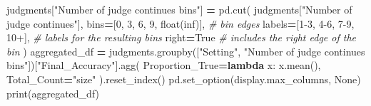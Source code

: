 \documentclass[
]{article}
\newenvironment{Shaded}{\begin{snugshade}}{\end{snugshade}}
\newcommand{\BuiltInTok}[1]{#1}
\newcommand{\CommentTok}[1]{\textcolor[rgb]{0.56,0.35,0.01}{\textit{#1}}}
\newcommand{\DecValTok}[1]{\textcolor[rgb]{0.00,0.00,0.81}{#1}}
\newcommand{\KeywordTok}[1]{\textcolor[rgb]{0.13,0.29,0.53}{\textbf{#1}}}
\newcommand{\NormalTok}[1]{#1}
\newcommand{\OperatorTok}[1]{\textcolor[rgb]{0.81,0.36,0.00}{\textbf{#1}}}
\newcommand{\StringTok}[1]{\textcolor[rgb]{0.31,0.60,0.02}{#1}}
\newcommand{\VariableTok}[1]{\textcolor[rgb]{0.00,0.00,0.00}{#1}}
\begin{document}
\begin{Shaded}
\begin{Highlighting}[]
\NormalTok{judgments[}\StringTok{"Number of judge continues bins"}\NormalTok{] }\OperatorTok{=}\NormalTok{ pd.cut(}
\NormalTok{    judgments[}\StringTok{"Number of judge continues"}\NormalTok{], }
\NormalTok{    bins}\OperatorTok{=}\NormalTok{[}\DecValTok{0}\NormalTok{, }\DecValTok{3}\NormalTok{, }\DecValTok{6}\NormalTok{, }\DecValTok{9}\NormalTok{, }\BuiltInTok{float}\NormalTok{(}\StringTok{\textquotesingle{}inf\textquotesingle{}}\NormalTok{)],  }\CommentTok{\# bin edges}
\NormalTok{    labels}\OperatorTok{=}\NormalTok{[}\StringTok{\textquotesingle{}1{-}3\textquotesingle{}}\NormalTok{, }\StringTok{\textquotesingle{}4{-}6\textquotesingle{}}\NormalTok{, }\StringTok{\textquotesingle{}7{-}9\textquotesingle{}}\NormalTok{, }\StringTok{\textquotesingle{}10+\textquotesingle{}}\NormalTok{],  }\CommentTok{\# labels for the resulting bins}
\NormalTok{    right}\OperatorTok{=}\VariableTok{True}  \CommentTok{\# includes the right edge of the bin}
\NormalTok{)}
\NormalTok{aggregated\_df }\OperatorTok{=}\NormalTok{ judgments.groupby([}\StringTok{"Setting"}\NormalTok{, }\StringTok{"Number of judge continues bins"}\NormalTok{])[}\StringTok{"Final\_Accuracy"}\NormalTok{].agg(}
\NormalTok{    Proportion\_True}\OperatorTok{=}\KeywordTok{lambda}\NormalTok{ x: x.mean(),}
\NormalTok{    Total\_Count}\OperatorTok{=}\StringTok{"size"}
\NormalTok{).reset\_index()}
\NormalTok{pd.set\_option(}\StringTok{\textquotesingle{}display.max\_columns\textquotesingle{}}\NormalTok{, }\VariableTok{None}\NormalTok{)}
\BuiltInTok{print}\NormalTok{(aggregated\_df)}
\end{Highlighting}
\end{Shaded}
\end{document}
